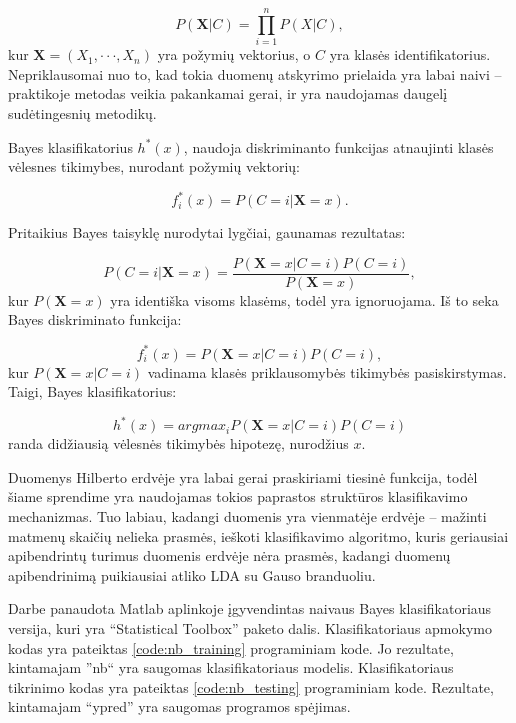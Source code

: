 \documentclass[]{vgtuef}
\begin{document}
\begin{equation}
	P(\mathbf{X}|C) = \prod_{i=1}^{n} P(X|C),
\end{equation}
kur $\mathbf{X} = (X_1, \cdot \cdot \cdot, X_n)$ yra požymių vektorius, o $C$ yra klasės identifikatorius. Nepriklausomai nuo to, kad tokia duomenų atskyrimo prielaida yra labai naivi -- praktikoje metodas veikia pakankamai gerai, ir yra naudojamas daugelį sudėtingesnių metodikų.

Bayes klasifikatorius $h^*(x)$, naudoja diskriminanto funkcijas atnaujinti klasės vėlesnes tikimybes, nurodant požymių vektorių:

\begin{equation}
	f^*_i(x) = P(C=i|\mathbf{X}=x).
\end{equation}

Pritaikius Bayes taisyklę nurodytai lygčiai, gaunamas rezultatas:

\begin{equation}
P(C=i|\mathbf{X}=x) = \frac{P(\mathbf{X}=x|C=i)P(C=i)}{P(\mathbf{X}=x)},
\end{equation}
kur $P(\mathbf{X}=x)$ yra identiška visoms klasėms, todėl yra ignoruojama. Iš to seka Bayes diskriminato funkcija:

\begin{equation}
	f^*_i(x) = P(\mathbf{X}=x|C=i)P(C=i),
\end{equation}
kur $P(\mathbf{X}=x|C=i)$ vadinama klasės priklausomybės tikimybės pasiskirstymas. Taigi, Bayes klasifikatorius:

\begin{equation}
h^*(x) = arg max_i P(\mathbf{X}=x|C=i)P(C=i)
\end{equation}
randa didžiausią vėlesnės tikimybės hipotezę, nurodžius $x$.

Duomenys Hilberto erdvėje yra labai gerai praskiriami tiesinė funkcija, todėl šiame sprendime yra naudojamas tokios paprastos struktūros klasifikavimo mechanizmas. Tuo labiau, kadangi duomenis yra vienmatėje erdvėje -- mažinti matmenų skaičių nelieka prasmės, ieškoti klasifikavimo algoritmo, kuris geriausiai apibendrintų turimus duomenis erdvėje nėra prasmės, kadangi duomenų apibendrinimą puikiausiai atliko LDA su Gauso branduoliu.

Darbe panaudota Matlab aplinkoje įgyvendintas naivaus Bayes klasifikatoriaus versija, kuri yra ``Statistical Toolbox'' paketo dalis. Klasifikatoriaus apmokymo kodas yra pateiktas \ref{code:nb_training} programiniam kode. Jo rezultate, kintamajam ''nb`` yra saugomas klasifikatoriaus modelis. Klasifikatoriaus tikrinimo kodas yra pateiktas \ref{code:nb_testing} programiniam kode. Rezultate, kintamajam ``ypred'' yra saugomas programos spėjimas.
\end{document}
